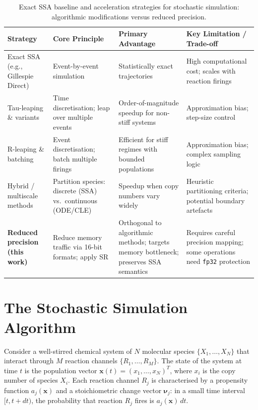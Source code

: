 \documentclass{article}
\begin{document}
\begin{table}[t]
	\centering
	\small
	\begin{tabular}{@{}p{2.8cm}p{3.2cm}p{3.5cm}p{4.5cm}@{}}
		\toprule
		\textbf{Strategy} & \textbf{Core Principle} & \textbf{Primary Advantage} & \textbf{Key Limitation / Trade-off} \\
		\midrule
		Exact SSA (e.g., Gillespie Direct) 
		& Event-by-event simulation 
		& Statistically exact trajectories 
		& High computational cost; scales with reaction firings \cite{gillespie1977,anderson2007} \\
		\addlinespace
		
		Tau-leaping \& variants 
		& Time discretisation; leap over multiple events 
		& Order-of-magnitude speedup for non-stiff systems 
		& Approximation bias; step-size control \cite{gillespie2001,cao2006,anderson2008} \\
		\addlinespace
		
		R-leaping \& batching 
		& Event discretisation; batch multiple firings 
		& Efficient for stiff regimes with bounded populations 
		& Approximation bias; complex sampling logic \cite{rleap1,rleap2} \\
		\addlinespace
		
		Hybrid / multiscale methods 
		& Partition species: discrete (SSA) vs.\ continuous (ODE/CLE) 
		& Speedup when copy numbers vary widely 
		& Heuristic partitioning criteria; potential boundary artefacts \cite{hybrid1,hybrid2} \\
		\addlinespace
		
		\textbf{Reduced precision (this work)} 
			& Reduce memory traffic via 16-bit formats; apply SR 
		& Orthogonal to algorithmic methods; targets memory bottleneck; preserves SSA semantics 
		& Requires careful precision mapping; some operations need \texttt{fp32} protection \\
		\bottomrule
	\end{tabular}
	\caption{Exact SSA baseline and acceleration strategies for stochastic simulation: algorithmic modifications versus reduced precision.}
	\label{tab:taxonomy}
\end{table}




\section{The Stochastic Simulation Algorithm}
\label{sec:ssa}

Consider a well-stirred chemical system of $N$ molecular species $\{X_1, \ldots, X_N\}$ that interact through $M$ reaction channels $\{R_1, \ldots, R_M\}$. The state of the system at time $t$ is the population vector $\mathbf{x}(t) = (x_1, \ldots, x_N)^T$, where $x_i$ is the copy number of species $X_i$. Each reaction channel $R_j$ is characterised by a propensity function $a_j(\mathbf{x})$ and a stoichiometric change vector $\boldsymbol{\nu}_j$: in a small time interval $[t, t+dt)$, the probability that reaction $R_j$ fires is $a_j(\mathbf{x})\,dt$.
\end{document}
